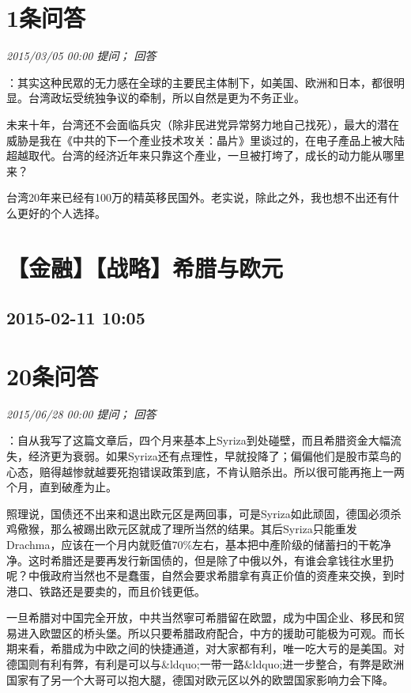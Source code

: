 \documentclass[twocolumn]{ctexart}
\begin{document}
\section{1条问答}

\textit{\hfill\noindent\small 2015/03/05 00:00 提问； 回答}

：其实这种民眾的无力感在全球的主要民主体制下，如美国、欧洲和日本，都很明显。台湾政坛受统独争议的牵制，所以自然是更为不务正业。

未来十年，台湾还不会面临兵灾（除非民进党异常努力地自己找死），最大的潜在威胁是我在《中共的下一个產业技术攻关：晶片》里谈过的，在电子產品上被大陆超越取代。台湾的经济近年来只靠这个產业，一旦被打垮了，成长的动力能从哪里来？

台湾20年来已经有100万的精英移民国外。老实说，除此之外，我也想不出还有什么更好的个人选择。\\


\section{【金融】【战略】希腊与欧元 }
\subsection{2015-02-11 10:05}


\section{20条问答}

\textit{\hfill\noindent\small 2015/06/28 00:00 提问； 回答}

：自从我写了这篇文章后，四个月来基本上Syriza到处碰壁，而且希腊资金大幅流失，经济更为衰弱。如果Syriza还有点理性，早就投降了；偏偏他们是股市菜鸟的心态，赔得越惨就越要死抱错误政策到底，不肯认赔杀出。所以很可能再拖上一两个月，直到破產为止。

照理说，国债还不出来和退出欧元区是两回事，可是Syriza如此顽固，德国必须杀鸡儆猴，那么被踢出欧元区就成了理所当然的结果。其后Syriza只能重发Drachma，应该在一个月内就贬值70\%左右，基本把中產阶级的储蓄扫的干乾净净。这时希腊还是要再发行新国债的，但是除了中俄以外，有谁会拿钱往水里扔呢？中俄政府当然也不是蠢蛋，自然会要求希腊拿有真正价值的资產来交换，到时港口、铁路还是要卖的，而且价钱更低。

一旦希腊对中国完全开放，中共当然寧可希腊留在欧盟，成为中国企业、移民和贸易进入欧盟区的桥头堡。所以只要希腊政府配合，中方的援助可能极为可观。而长期来看，希腊成为中欧之间的快捷通道，对大家都有利，唯一吃大亏的是美国。对德国则有利有弊，有利是可以与\&ldquo;一带一路\&ldquo;进一步整合，有弊是欧洲国家有了另一个大哥可以抱大腿，德国对欧元区以外的欧盟国家影响力会下降。\\
\end{document}
